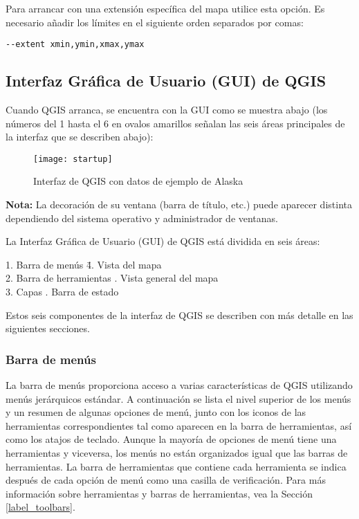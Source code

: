 Para arrancar con una extensión específica del mapa utilice esta opción. Es necesario
añadir los límites en el siguiente orden separados por comas:
\begin{verbatim}
--extent xmin,ymin,xmax,ymax
\end{verbatim}


\subsection{Interfaz Gráfica de Usuario (GUI) de QGIS}
\label{label_qgismainwindow}

Cuando QGIS arranca, se encuentra con la GUI como se muestra abajo
(los números del 1 hasta el 6 en ovalos amarillos señalan las seis áreas principales 
de la interfaz que se describen abajo):

\begin{figure}[ht]
   \begin{center}
   \caption{Interfaz de QGIS con datos de ejemplo de Alaska \nixcaption}
	 \label{fig:startup}
   \texttt{[image: startup]}
\end{center} 
\end{figure}

\textbf{Nota:} La decoración de su ventana (barra de título, etc.) puede aparecer 
distinta dependiendo del sistema operativo y administrador de ventanas.

La Interfaz Gráfica de Usuario (GUI) de QGIS está dividida en seis áreas:

\begin{tabbing}
1. Barra de menús \hspace{3cm}\= 4. Vista del mapa \\
2. Barra de herramientas \hspace{3cm}. Vista general del mapa \\
3. Capas \hspace{3cm}. Barra de estado   
\end{tabbing}

Estos seis componentes de la interfaz de QGIS se describen con más detalle
en las siguientes secciones.

\subsubsection{Barra de menús}\label{label_menubar}

La barra de menús proporciona acceso a varias características de QGIS utilizando 
menús jerárquicos estándar. A continuación se lista el nivel superior de los menús
y un resumen de algunas opciones de menú, junto con los iconos de las herramientas
correspondientes tal como aparecen en la barra de herramientas, así como los atajos de
teclado. Aunque la mayoría de opciones de menú tiene una herramientas y viceversa,
los menús no están organizados igual que las barras de herramientas. La barra de
herramientas que contiene cada herramienta se indica después de cada opción de menú
como una casilla de verificación. Para más información sobre herramientas y barras
de herramientas, vea la Sección \ref{label_toolbars}.

